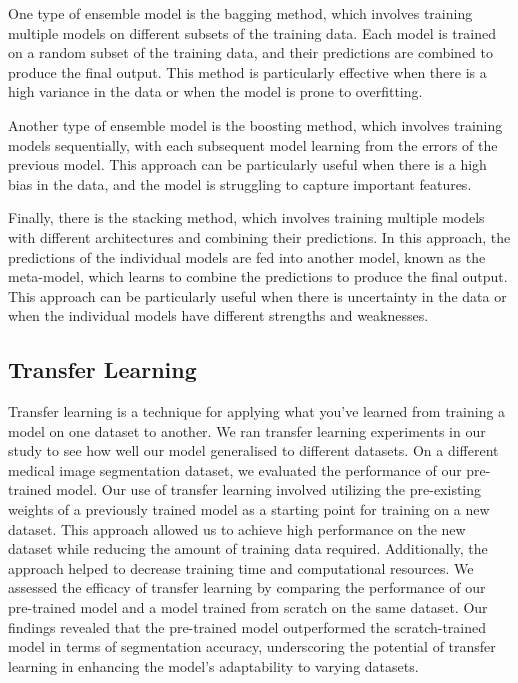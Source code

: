 \documentclass[conference]{IEEEtran}
\begin{document}
One type of ensemble model is the bagging method, which involves training multiple models on different subsets of the training data. Each model is trained on a random subset of the training data, and their predictions are combined to produce the final output. This method is particularly effective when there is a high variance in the data or when the model is prone to overfitting.

Another type of ensemble model is the boosting method, which involves training models sequentially, with each subsequent model learning from the errors of the previous model. This approach can be particularly useful when there is a high bias in the data, and the model is struggling to capture important features.

Finally, there is the stacking method, which involves training multiple models with different architectures and combining their predictions. In this approach, the predictions of the individual models are fed into another model, known as the meta-model, which learns to combine the predictions to produce the final output. This approach can be particularly useful when there is uncertainty in the data or when the individual models have different strengths and weaknesses.

\subsection{Transfer Learning}\label{SCM}
Transfer learning is a technique for applying what you've learned from training a model on one dataset to another. We ran transfer learning experiments in our study to see how well our model generalised to different datasets. On a different medical image segmentation dataset, we evaluated the performance of our pre-trained model.
Our use of transfer learning involved utilizing the pre-existing weights of a previously trained model as a starting point for training on a new dataset. This approach allowed us to achieve high performance on the new dataset while reducing the amount of training data required. Additionally, the approach helped to decrease training time and computational resources.
We assessed the efficacy of transfer learning by comparing the performance of our pre-trained model and a model trained from scratch on the same dataset. Our findings revealed that the pre-trained model outperformed the scratch-trained model in terms of segmentation accuracy, underscoring the potential of transfer learning in enhancing the model's adaptability to varying datasets.
\end{document}
